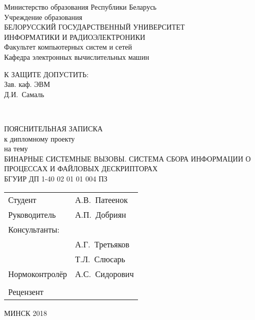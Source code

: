 \begin{titlepage}
  \begin{center}
    Министерство образования Республики Беларусь\\[1em]
    Учреждение образования\\
    БЕЛОРУССКИЙ ГОСУДАРСТВЕННЫЙ УНИВЕРСИТЕТ \\
    ИНФОРМАТИКИ И РАДИОЭЛЕКТРОНИКИ\\[1em]

    Факультет компьютерных систем и сетей \\[0.6cm]

    Кафедра электронных вычислительных машин \\[1.4cm]

    \begin{flushright}
      \begin{minipage}{0.4\textwidth}
        \MakeUppercase{К защите допустить:}\\
        Зав. каф. ЭВМ\\
        \underline{\hspace*{2.8cm}} Д.И.~Самаль
      \end{minipage}\\[3.2em]
    \end{flushright}

    {ПОЯСНИТЕЛЬНАЯ ЗАПИСКА}\\
    {к дипломному проекту}\\
    {на тему}\\
    {\MakeUppercase{Бинарные системные вызовы. Система сбора информации о процессах и файловых дескрипторах}}\\[2em]


    {БГУИР ДП 1-40 02 01 01 004 ПЗ}\\[2em]

    \begin{tabular}{ p{}p{} }
      Студент & А.В.~Патеенок  \\[1em]

      Руководитель & А.П.~Добриян \\[1em]

      Консультанты: &\\[1em]

      \hspace*{6ex}{от кафедры ЭВМ} & А.Г.~Третьяков \\[1em]

      \hspace*{6ex}{по экономической части} & Т.Л.~Слюсарь \\[1em]

      Нормоконтролёр & А.С.~Сидорович\\
      & \\
      Рецензент &
    \end{tabular}

    \vfill
    {\normalsize МИНСК 2018}
  \end{center}
\end{titlepage}
